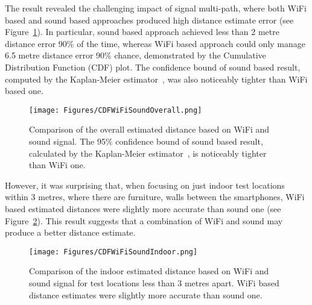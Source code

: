\documentclass[graybox]{svmult}
\begin{document}
The result revealed the challenging impact of signal multi-path, where both WiFi based and sound based approaches produced high distance estimate error (see Figure~\ref{CDFWiFiSoundOverall}). In particular, sound based approach achieved less than 2 metre distance error 90\% of the time, whereas WiFi based approach could only manage 6.5 metre distance error 90\% chance, demonstrated by the Cumulative Distribution Function (CDF) plot. The confidence bound of sound based result, computed by the Kaplan-Meier estimator~\cite{goel2010understanding}, was also noticeably tighter than WiFi based one.
\begin{figure}[h]
    \centering
    \sidecaption
    \texttt{[image: Figures/CDFWiFiSoundOverall.png]}
    \caption{Comparison of the overall estimated distance based on WiFi and sound signal. The 95\% confidence bound of sound based result, calculated by the Kaplan-Meier estimator~\cite{goel2010understanding}, is noticeably tighter than WiFi one.}
    \label{CDFWiFiSoundOverall}       
\end{figure}

However, it was surprising that, when focusing on just indoor test locations within 3 metres, where there are furniture, walls between the smartphones, WiFi based estimated distances were slightly more accurate than sound one (see Figure~\ref{CDFWiFiSoundIndoor}). This result suggests that a combination of WiFi and sound may produce a better distance estimate.
\begin{figure}[h]
    \centering
    \sidecaption
    \texttt{[image: Figures/CDFWiFiSoundIndoor.png]}
    \caption{Comparison of the indoor estimated distance based on WiFi and sound signal for test locations less than 3 metres apart. WiFi based distance estimates were slightly more accurate than sound one.}
    \label{CDFWiFiSoundIndoor}       
\end{figure}



\end{document}
